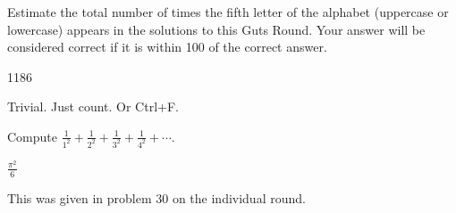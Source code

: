 \documentclass[11pt]{article}
\begin{document}
\begin{problem}
Estimate the total number of times the fifth letter of the alphabet (uppercase or lowercase) appears in the solutions to this Guts Round. Your answer will be considered correct if it is within 100 of the correct answer.
\end{problem}

\begin{answer}
1186
\end{answer}

\begin{solution}
Trivial. Just count. Or Ctrl+F.
\end{solution}

\begin{problem}
Compute $\frac{1}{1^2} + \frac{1}{2^2} + \frac{1}{3^2} + \frac{1}{4^2} + \cdots$.
\end{problem}

\begin{answer}
$\frac{\pi^2}{6}$
\end{answer}

\begin{problem}
This was given in problem 30 on the individual round.
\end{problem}
\end{document}
